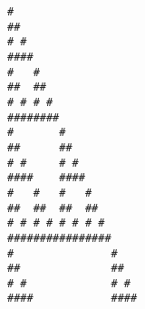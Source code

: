 \begin{center}
\begin{BVerbatim}
#
##
# #
####
#   #
##  ##
# # # #
########
#       #
##      ##
# #     # #
####    ####
#   #   #   #
##  ##  ##  ##
# # # # # # # #
################
#               #
##              ##
# #             # #
####            ####
\end{BVerbatim}
\end{center}

